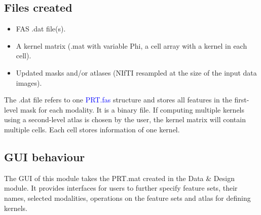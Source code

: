 




\subsection{Files created}

\begin{itemize}
\item FAS .dat file(s).
\item A kernel matrix (.mat with variable Phi, a cell array with a kernel in each cell).
\item Updated masks and/or atlases (NIfTI resampled at the size of the input data images).
\end{itemize}




The .dat file refers to one \textcolor{blue}{PRT.fas} structure and stores all features in the first-level mask for each modality. It is a binary file. If computing multiple kernels using a second-level atlas is chosen by the user, the kernel matrix will contain multiple cells. Each cell stores information of one kernel. 


\subsection{GUI behaviour}

The GUI of this module takes the PRT.mat created in the Data \& Design module. It provides interfaces for users to further specify feature sets, their names, selected modalities, operations on the feature sets and atlas for defining kernels.
\\

